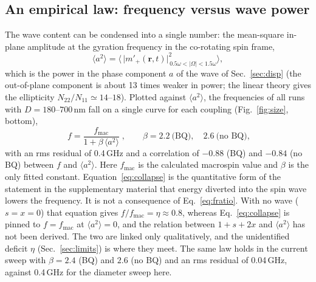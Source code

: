 \documentclass[11pt,a4paper]{article}
\newcommand{\vect}[1]{\mathbf{#1}}
\begin{document}
\subsection{An empirical law: frequency versus wave power}
The wave content can be condensed into a single number: the mean-square in-plane amplitude at the gyration
frequency in the co-rotating spin frame,
\begin{equation}
\langle a^2\rangle=\Big\langle\,\big|m'_+(\vect r,t)\big|^2_{\,0.5\omega<|\Omega|<1.5\omega}\Big\rangle ,
\end{equation}
which is the power in the phase component $a$ of the wave of Sec.~\ref{sec:disp} (the out-of-plane component is
about 13 times weaker in power; the linear theory gives the ellipticity $N_{22}/N_{11}\simeq14$--$18$).  Plotted
against $\langle a^2\rangle$, the frequencies of all runs with $D=180$--$700$\,nm fall on a single curve for
each coupling (Fig.~\ref{fig:size}, bottom),
\begin{equation}
\boxed{\;f=\frac{f_\mathrm{mac}}{1+\beta\,\langle a^2\rangle}\;},\qquad
\beta=2.2\ \text{(BQ)},\quad 2.6\ \text{(no BQ)},
\label{eq:collapse}
\end{equation}
with an rms residual of 0.4\,GHz and a correlation of $-0.88$ (BQ) and $-0.84$ (no BQ) between $f$ and
$\langle a^2\rangle$.  Here $f_\mathrm{mac}$ is the calculated macrospin value and $\beta$ is the only fitted
constant.  Equation~\eqref{eq:collapse} is the quantitative form of the statement in the supplementary material
that energy diverted into the spin wave lowers the frequency.
It is not a consequence of Eq.~\eqref{eq:fratio}.  With no wave ($s=x=0$) that equation gives $f/f_\mathrm{mac}=\eta
\approx0.8$, whereas Eq.~\eqref{eq:collapse} is pinned to $f=f_\mathrm{mac}$ at $\langle a^2\rangle=0$, and the
relation between $1+s+2x$ and $\langle a^2\rangle$ has not been derived.  The two are linked only qualitatively,
and the unidentified deficit $\eta$ (Sec.~\ref{sec:limits}) is where they meet.  The same law holds in the current
sweep with $\beta=2.4$ (BQ) and $2.6$ (no BQ) and an rms residual of 0.04\,GHz, against 0.4\,GHz
for the diameter sweep here.
\end{document}
